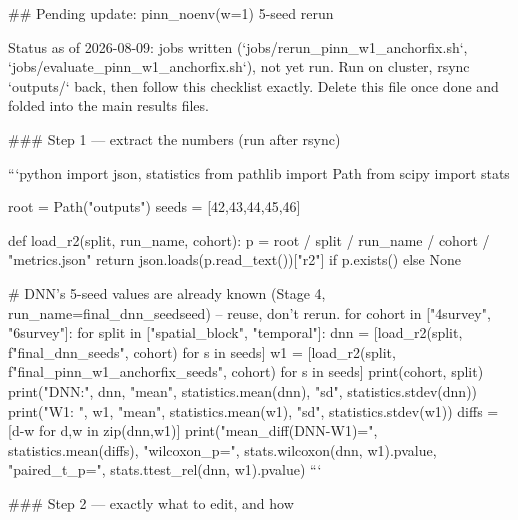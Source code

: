 ## Pending update: pinn_noenv(w=1) 5-seed rerun

Status as of 2026-08-09: jobs written (`jobs/rerun_pinn_w1_anchorfix.sh`, `jobs/evaluate_pinn_w1_anchorfix.sh`),
not yet run. Run on cluster, rsync `outputs/` back, then follow this checklist exactly. Delete this
file once done and folded into the main results files.

### Step 1 — extract the numbers (run after rsync)

```python
import json, statistics
from pathlib import Path
from scipy import stats

root = Path("outputs")
seeds = [42,43,44,45,46]

def load_r2(split, run_name, cohort):
    p = root / split / run_name / cohort / "metrics.json"
    return json.loads(p.read_text())["r2"] if p.exists() else None

# DNN's 5-seed values are already known (Stage 4, run_name=final_dnn_seed{seed}) -- reuse, don't rerun.
for cohort in ["4survey", "6survey"]:
    for split in ["spatial_block", "temporal"]:
        dnn = [load_r2(split, f"final_dnn_seed{s}", cohort) for s in seeds]
        w1 = [load_r2(split, f"final_pinn_w1_anchorfix_seed{s}", cohort) for s in seeds]
        print(cohort, split)
        print("DNN:", dnn, "mean", statistics.mean(dnn), "sd", statistics.stdev(dnn))
        print("W1: ", w1, "mean", statistics.mean(w1), "sd", statistics.stdev(w1))
        diffs = [d-w for d,w in zip(dnn,w1)]
        print("mean_diff(DNN-W1)=", statistics.mean(diffs),
              "wilcoxon_p=", stats.wilcoxon(dnn, w1).pvalue,
              "paired_t_p=", stats.ttest_rel(dnn, w1).pvalue)
```

### Step 2 — exactly what to edit, and how

